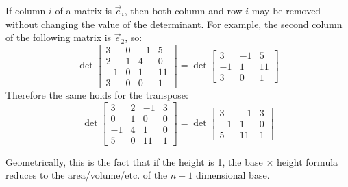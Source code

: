 \begin{applicationActivities}
\begin{fact}
If column $i$ of a matrix is $\vec{e}_i$, then both column and row $i$
may be removed without changing the value of the determinant.
For example, the second column of the following matrix is \(\vec e_2\), so:
\[
  \det \begin{bmatrix}
    3 & 0 & -1 & 5 \\
    2 & 1 & 4 & 0 \\
    -1 & 0 & 1 & 11 \\
    3 & 0 & 0 & 1
  \end{bmatrix} =
  \det \begin{bmatrix}
    3 & -1 & 5 \\
    -1 & 1 & 11 \\
    3 & 0 & 1
  \end{bmatrix}
\]
Therefore the same holds for the transpose:
\[
  \det \begin{bmatrix}
    3 & 2 & -1 & 3 \\
    0 & 1 & 0 & 0 \\
    -1 & 4 & 1 & 0 \\
    5 & 0 & 11 & 1
  \end{bmatrix} =
  \det \begin{bmatrix}
    3 & -1 & 3 \\
    -1 & 1 & 0 \\
    5 & 11 & 1
  \end{bmatrix}
\]

Geometrically, this is the fact that if the height is 1, the base $\times$ height formula reduces to the area/volume/etc. of the $n-1$ dimensional base.
\end{fact}


\end{applicationActivities}
